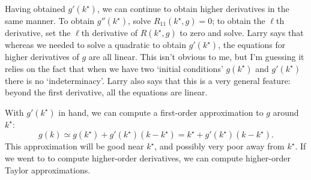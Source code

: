 \documentclass[11pt,letterpaper,reqno,oneside]{article}
\begin{document}
Having obtained $g'(k^\star)$, we can continue to obtain higher derivatives in the same manner. To obtain $g''(k^\star)$, solve $R_{11}(k^\star,g)=0$; to obtain the $\ell$th derivative, set the $\ell$th derivative of $R(k^\star,g)$ to zero and solve. Larry says that whereas we needed to solve a quadratic to obtain $g'(k^\star)$, the equations for higher derivatives of $g$ are all linear. This isn't obvious to me, but I'm guessing it relies on the fact that when we have two `initial conditions' $g(k^\star)$ and $g'(k^\star)$ there is no `indeterminacy'. Larry also says that this is a very general feature: beyond the first derivative, all the equations are linear.


With $g'(k^\star)$ in hand, we can compute a first-order approximation to $g$ around $k^\star$:
%
\begin{equation*}
	g(k) 
	\simeq g(k^\star) + g'(k^\star) (k-k^\star) 
	= k^\star + g'(k^\star) (k-k^\star) .
\end{equation*}
%
This approximation will be good near $k^\star$, and possibly very poor away from $k^\star$. If we went to to compute higher-order derivatives, we can compute higher-order Taylor approximations.
\end{document}
